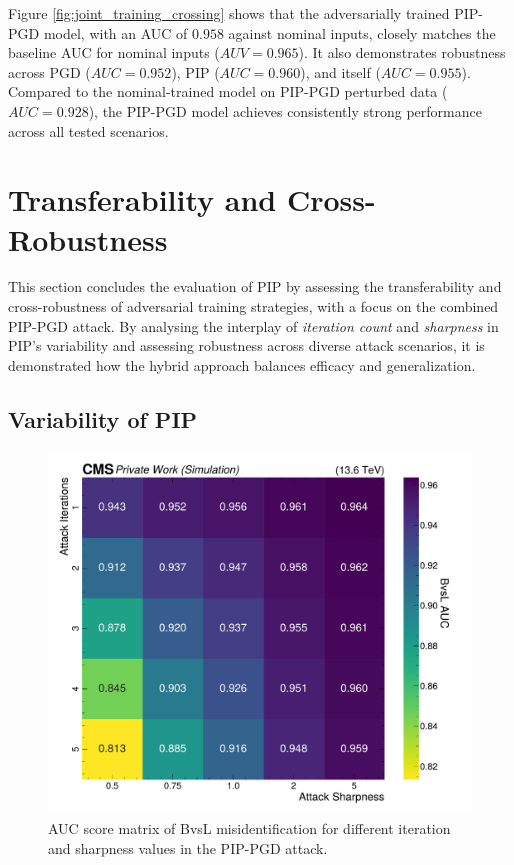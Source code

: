 Figure \ref{fig:joint_training_crossing} shows that the adversarially trained PIP-PGD model, with an AUC of $0.958$ against nominal inputs, closely matches the baseline AUC for nominal inputs ($AUV = 0.965$). It also demonstrates robustness across PGD ($AUC = 0.952$), PIP ($AUC = 0.960$), and itself ($AUC = 0.955$). Compared to the nominal-trained model on PIP-PGD perturbed data ($AUC = 0.928$), the PIP-PGD model achieves consistently strong performance across all tested scenarios.



\section{Transferability and Cross-Robustness}

This section concludes the evaluation of PIP by assessing the transferability and cross-robustness of adversarial training strategies, with a focus on the combined PIP-PGD attack. By analysing the interplay of \textit{iteration count} and \textit{sharpness} in PIP’s variability and assessing robustness across diverse attack scenarios, it is demonstrated how the hybrid approach balances efficacy and generalization.

\subsection{Variability of PIP}
\label{sec:intprob_variability}

\begin{figure}[h]
\centering
    \includegraphics[width=12cm]{media/output/sharpness_iterations_scan.pdf}
    \caption{AUC score matrix of BvsL misidentification for different iteration and sharpness values in the PIP-PGD attack.}
    \label{fig:joint_sharpness_vs_iterarions}
\end{figure}

